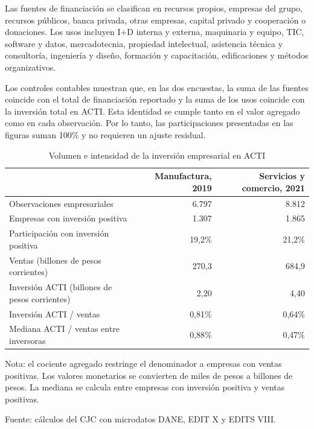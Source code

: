 Las fuentes de financiación se clasifican en recursos propios, empresas del grupo, recursos públicos, banca privada, otras empresas, capital privado y cooperación o donaciones. Los usos incluyen I+D interna y externa, maquinaria y equipo, TIC, software y datos, mercadotecnia, propiedad intelectual, asistencia técnica y consultoría, ingeniería y diseño, formación y capacitación, edificaciones y métodos organizativos.

Los controles contables muestran que, en las dos encuestas, la suma de las fuentes coincide con el total de financiación reportado y la suma de los usos coincide con la inversión total en ACTI. Esta identidad se cumple tanto en el valor agregado como en cada observación. Por lo tanto, las participaciones presentadas en las figuras suman 100\% y no requieren un ajuste residual.

\begin{table}[H]
\centering
\caption{Volumen e intensidad de la inversión empresarial en ACTI}
\label{tab:resumen}
\begin{threeparttable}
\begin{tabular}{lrr}
\toprule
 & Manufactura, 2019 & Servicios y comercio, 2021 \\
\midrule
Observaciones empresariales & 6.797 & 8.812 \\
Empresas con inversión positiva & 1.307 & 1.865 \\
Participación con inversión positiva & 19,2\% & 21,2\% \\
Ventas (billones de pesos corrientes) & 270,3 & 684,9 \\
Inversión ACTI (billones de pesos corrientes) & 2,20 & 4,40 \\
Inversión ACTI / ventas & 0,81\% & 0,64\% \\
Mediana ACTI / ventas entre inversoras & 0,88\% & 0,47\% \\
\bottomrule
\end{tabular}
\begin{tablenotes}\footnotesize
\item Nota: el cociente agregado restringe el denominador a empresas con ventas positivas. Los valores monetarios se convierten de miles de pesos a billones de pesos. La mediana se calcula entre empresas con inversión positiva y ventas positivas.
\item Fuente: cálculos del CJC con microdatos DANE, EDIT X y EDITS VIII.
\end{tablenotes}
\end{threeparttable}
\end{table}

